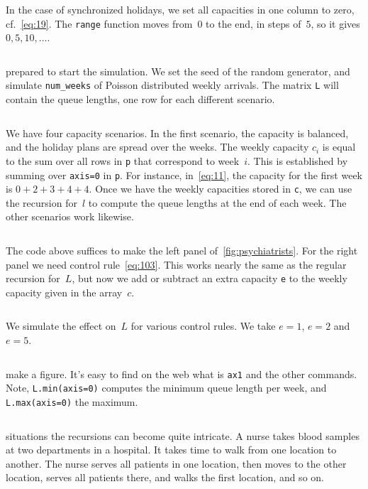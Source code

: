 \documentclass[stochastic-or.tex]{subfiles}
\begin{document}
In the case of synchronized holidays, we set all capacities in one column to zero, cf.~\cref{eq:19}.
The \texttt{range} function moves from~$0$ to the end, in steps of~$5$, so it gives $0, 5, 10, \ldots$.
\inputminted[firstline=99, lastline=102]{python}{../code/psychiatrists.py} %


 prepared to start the simulation. We set the seed of the random generator, and simulate \texttt{num_weeks} of Poisson distributed weekly arrivals. The matrix \texttt{L} will contain the queue lengths, one row for each different scenario.

\inputminted[firstline=109, lastline=112]{python}{../code/psychiatrists.py} %

We have four capacity scenarios.
In the first scenario, the capacity is balanced, and the holiday plans are spread over the weeks.
The weekly capacity $c_{i}$ is equal to the sum over all rows in \texttt{p} that correspond to week~$i$. This is established by summing over \texttt{axis=0} in \texttt{p}.
For instance, in~\cref{eq:11}, the capacity for the first week is $0+2+3+4+4$.
Once we have the weekly capacities stored in \texttt{c}, we can use the recursion for~$l$ to compute the queue lengths at the end of each week.
The other scenarios work likewise.
\inputminted[firstline=116, lastline=134]{python}{../code/psychiatrists.py} %


The code above suffices to make the left panel of~\cref{fig:psychiatrists}. For the right panel we need  control rule~\cref{eq:103}. This works nearly the same as the regular recursion for~$L$, but now we add or subtract an extra capacity \texttt{e} to the weekly capacity given in the array~$c$.
\inputminted[firstline=44, lastline=53]{python}{../code/psychiatrists.py} %

We simulate the effect on~$L$ for various control rules. We take $e=1$, $e=2$ and $e=5$.
\inputminted[firstline=139, lastline=144]{python}{../code/psychiatrists.py} %

 make a figure.
It's easy to find on the web what is \texttt{ax1} and the other commands.
Note, \texttt{L.min(axis=0)} computes the minimum queue length per week, and \texttt{L.max(axis=0)} the maximum.
\inputminted[firstline=149, lastline=166]{python}{../code/psychiatrists.py} %


 situations the recursions can become quite intricate.
A nurse
takes blood samples at two departments in a hospital.
It takes time to walk from one location to another.
The nurse serves all patients in one location, then moves to the other location, serves all patients there, and walks the first location, and so on.
\end{document}
